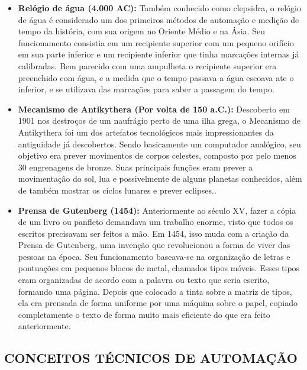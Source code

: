         \begin{itemize}
            \item \textbf{Relógio de água (4.000 AC):}
                Também conhecido como clepsidra, o relógio de água é considerado um dos primeiros métodos de automação e medição de tempo da história, com sua origem no Oriente Médio e na Ásia. Seu funcionamento consistia em um recipiente superior com um pequeno orifício em sua parte inferior e um recipiente inferior que tinha marcações internas já calibradas. Bem parecido com uma ampulheta o recipiente superior era preenchido com água, e a medida que o tempo passava a água escoava ate o inferior, e se utilizava das marcações para saber a passagem do tempo\cite{automacaoAntiga}.
              
            \item \textbf{Mecanismo de Antikythera (Por volta de 150 a.C.):}
                Descoberto em 1901 nos destroços de um naufrágio perto de uma ilha grega, o Mecanismo de Antikythera foi um dos artefatos tecnológicos mais impressionantes da antiguidade já descobertos. Sendo basicamente um computador analógico, seu objetivo era prever movimentos de corpos celestes, composto por pelo menos 30 engrenagens de bronze. Suas principais funções eram prever a movimentação do sol, lua e possivelmente de alguns planetas conhecidos, além de também mostrar os ciclos lunares e prever eclipses.\cite{automacaoAntiga}.

            \item \textbf{Prensa de Gutenberg (1454):}
                Anteriormente ao século XV, fazer a cópia de um livro ou panfleto demandava um trabalho enorme, visto que todos os escritos precisavam ser feitos a mão. Em 1454, isso muda com a criação da Prensa de Gutenberg, uma invenção que revolucionou a forma de viver das pessoas na época. Seu funcionamento baseava-se na organização de letras e pontuações em pequenos blocos de metal, chamados tipos móveis. Esses tipos eram organizadas de acordo com a palavra ou texto que seria escrito, formando uma página. Depois que colocado a tinta sobre a matriz de tipos, ela era prensada de forma uniforme por uma máquina sobre o papel, copiado completamente o texto de forma muito mais eficiente do que era feito anteriormente.\cite{automacaoAntiga}
                
        \end{itemize}

    \subsection{CONCEITOS TÉCNICOS DE AUTOMAÇÃO}

